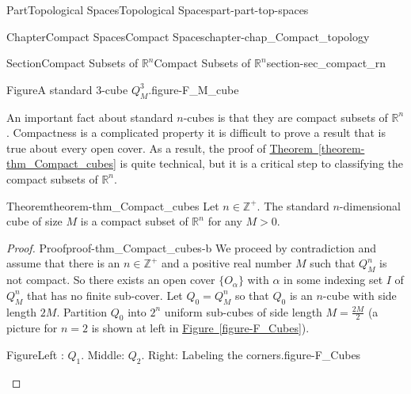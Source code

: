 \documentclass[oneside,10pt,]{book}
\newcommand{\xreffont}{\relax}
\numberwithin{equation}{chapter}
\newcommand{\Z}{\mathbb{Z}}
\newcommand{\R}{\mathbb{R}}
\newcommand{\gt}{>}
\begin{document}
\begin{partptx}{Part}{Topological Spaces}{}{Topological Spaces}{}{}{part-part-top-spaces}
\begin{chapterptx}{Chapter}{Compact Spaces}{}{Compact Spaces}{}{}{chapter-chap_Compact_topology}
\begin{sectionptx}{Section}{Compact Subsets of \(\R^n\)}{}{Compact Subsets of \(\R^n\)}{}{}{section-sec_compact_rn}
\begin{figureptx}{Figure}{A standard 3-cube \(Q^3_M\).}{figure-F_M_cube}{}
\begin{image}{0.3}{0.4}{0.3}{}
\end{image}%
\tcblower
\end{figureptx}%
An important fact about standard \(n\)-cubes is that they are compact subsets of \(\R^n\). Compactness is a complicated property \textemdash{} it is difficult to prove a result that is true about every open cover. As a result, the proof of \hyperref[theorem-thm_Compact_cubes]{Theorem~{\xreffont\ref{theorem-thm_Compact_cubes}}} is quite technical, but it is a critical step to classifying the compact subsets of \(\R^n\).%
\begin{theorem}{Theorem}{}{}{theorem-thm_Compact_cubes}%
Let \(n \in \Z^+\). The standard \(n\)-dimensional cube of size \(M\) is a compact subset of \(\R^n\) for any \(M \gt 0\).%
\end{theorem}
\begin{proof}{Proof}{}{proof-thm_Compact_cubes-b}
We proceed by contradiction and assume that there is an \(n \in \Z^+\) and a positive real number \(M\) such that \(Q^n_M\) is not compact. So there exists an open cover \(\{O_{\alpha}\}\) with \(\alpha\) in some indexing set \(I\) of \(Q^n_M\) that has no finite sub-cover. Let \(Q_0 = Q^n_M\) so that \(Q_0\) is an \(n\)-cube with side length \(2M\). Partition \(Q_0\) into \(2^n\) uniform sub-cubes of side length \(M = \frac{2M}{2}\) (a picture for \(n=2\) is shown at left in \hyperref[figure-F_Cubes]{Figure~{\xreffont\ref{figure-F_Cubes}}}).%
\begin{figureptx}{Figure}{Left : \(Q_1\). Middle: \(Q_2\). Right: Labeling the corners.}{figure-F_Cubes}{}%
\begin{sidebyside}{3}{0}{0}{0}%
\begin{sbspanel}{0.333333333333333}%

\end{sbspanel}
\end{sidebyside}
\end{figureptx}
\end{proof}
\end{sectionptx}
\end{chapterptx}
\end{partptx}
\end{document}
